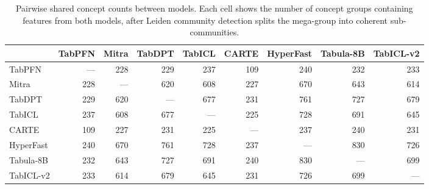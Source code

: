 \begin{table}[h]
\centering
\small
\begin{tabular}{lrrrrrrrr}
\toprule
 & TabPFN & Mitra & TabDPT & TabICL & CARTE & HyperFast & Tabula-8B & TabICL-v2 \\
\midrule
TabPFN & --- & 228 & 229 & 237 & 109 & 240 & 232 & 233 \\
Mitra & 228 & --- & 620 & 608 & 227 & 670 & 643 & 614 \\
TabDPT & 229 & 620 & --- & 677 & 231 & 761 & 727 & 679 \\
TabICL & 237 & 608 & 677 & --- & 225 & 728 & 691 & 645 \\
CARTE & 109 & 227 & 231 & 225 & --- & 237 & 240 & 231 \\
HyperFast & 240 & 670 & 761 & 728 & 237 & --- & 830 & 726 \\
Tabula-8B & 232 & 643 & 727 & 691 & 240 & 830 & --- & 699 \\
TabICL-v2 & 233 & 614 & 679 & 645 & 231 & 726 & 699 & --- \\
\bottomrule
\end{tabular}
\caption{Pairwise shared concept counts between models. Each cell shows the number of concept groups containing features from both models, after Leiden community detection splits the mega-group into coherent sub-communities.}
\label{tab:shared_concepts}
\end{table}